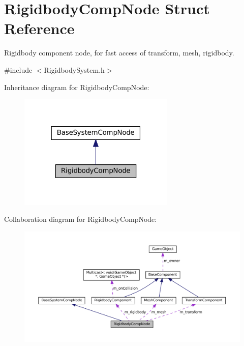\hypertarget{structRigidbodyCompNode}{}\section{Rigidbody\+Comp\+Node Struct Reference}
\label{structRigidbodyCompNode}


Rigidbody component node, for fast access of transform, mesh, rigidbody.  




{\ttfamily \#include $<$Rigidbody\+System.\+h$>$}



Inheritance diagram for Rigidbody\+Comp\+Node\+:
\nopagebreak
\begin{figure}[H]
\begin{center}
\leavevmode
\includegraphics[width=211pt]{structRigidbodyCompNode__inherit__graph}
\end{center}
\end{figure}


Collaboration diagram for Rigidbody\+Comp\+Node\+:
\nopagebreak
\begin{figure}[H]
\begin{center}
\leavevmode
\includegraphics[width=350pt]{structRigidbodyCompNode__coll__graph}
\end{center}
\end{figure}
